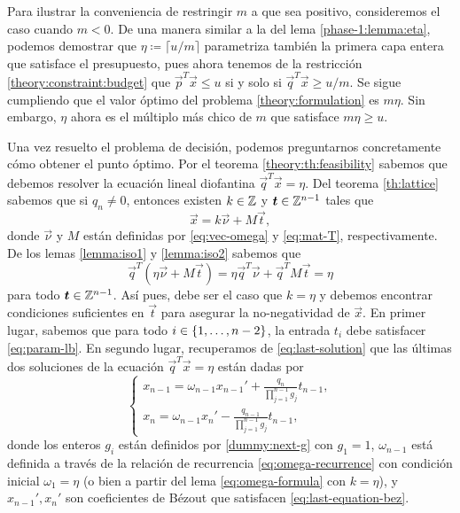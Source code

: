 \begin{observation}
	Para ilustrar la conveniencia de restringir $m$ a que sea positivo, consideremos el caso cuando
	$m < 0$. De una manera similar a la del lema \ref{phase-1:lemma:eta}, podemos demostrar que
	$\eta \coloneq \lceil u/m \rceil$ parametriza también la primera capa entera que satisface el
	presupuesto, pues ahora tenemos de la restricción \eqref{theory:constraint:budget} que
	$\vec{p}^T\vec{x} \leq u$ si y solo si $\vec{q}^T\vec{x} \geq u/m$. Se sigue cumpliendo que el
	valor óptimo del problema \eqref{theory:formulation} es $m\eta$. Sin embargo, $\eta$ ahora es el
	múltiplo más chico de $m$ que satisface $m\eta \geq u$.
\end{observation}

Una vez resuelto el problema de decisión, podemos preguntarnos concretamente cómo obtener el punto
óptimo. Por el teorema \ref{theory:th:feasibility} sabemos que debemos resolver la ecuación lineal
diofantina $\vec{q}^T\vec{x} = \eta$. Del teorema \ref{th:lattice} sabemos que si $q_n \neq 0$,
entonces existen $k \in \mathbb{Z}$ y $\boldsymbol{t} \in \mathbb{Z}^{n-1}$ tales que
\begin{equation*}
	\vec{x} = k\vec{\nu} + M\vec{t},
\end{equation*}
donde $\vec{\nu}$ y $M$ están definidas por \eqref{eq:vec-omega} y \eqref{eq:mat-T},
respectivamente. De los lemas \ref{lemma:iso1} y \ref{lemma:iso2} sabemos que
\begin{equation*}
	\vec{q}^T\left(\eta\vec{\nu} + M\vec{t}\right) = \eta\vec{q}^T\vec{\nu} + \vec{q}^TM\vec{t} = \eta
\end{equation*}
para todo $\boldsymbol{t} \in \mathbb{Z}^{n-1}$. Así pues, debe ser el caso que $k = \eta$ y debemos encontrar
condiciones suficientes en $\vec{t}$ para asegurar la no-negatividad de $\vec{x}$. En primer lugar,
sabemos que para todo $i \in \lbrace 1, \ldots, n - 2 \rbrace$, la entrada $t_i$ debe satisfacer
\eqref{eq:param-lb}. En segundo lugar, recuperamos de \eqref{eq:last-solution} que las últimas dos
soluciones de la ecuación $\vec{q}^T\vec{x} = \eta$ están dadas por
\begin{equation*}
	\begin{cases}
		x_{n-1} = \omega_{n-1}x_{n-1}' + \frac{q_n}{\prod_{j=1}^{n-1}g_j}t_{n-1}, \\
		x_n = \omega_{n-1}x_n' - \frac{q_{n-1}}{\prod_{j=1}^{n-1}g_j}t_{n-1},
	\end{cases}
\end{equation*}
donde los enteros $g_i$ están definidos por \eqref{dummy:next-g} con $g_1 = 1$, $\omega_{n-1}$ está
definida a través de la relación de recurrencia \eqref{eq:omega-recurrence} con condición inicial
$\omega_1 = \eta$ (o bien a partir del lema \ref{eq:omega-formula} con $k = \eta$), y $x_{n-1}',
x_n'$ son coeficientes de Bézout que satisfacen \eqref{eq:last-equation-bez}.

